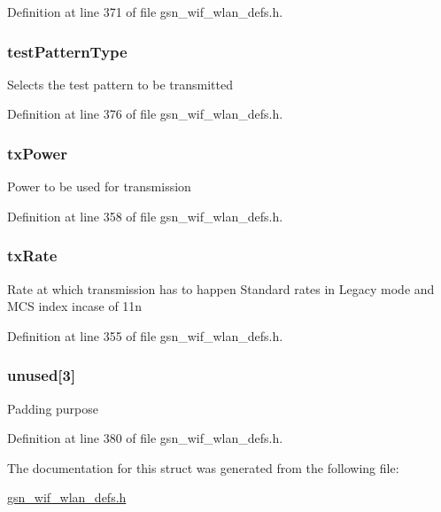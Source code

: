 Definition at line 371 of file gsn\_\-wif\_\-wlan\_\-defs.h.

\hypertarget{a00190_aed5aa730c4619f7bc2b04f439f4701a9}{
\subsubsection[{testPatternType}]{ {\bf testPatternType}}}
\label{a00190_aed5aa730c4619f7bc2b04f439f4701a9}
Selects the test pattern to be transmitted 

Definition at line 376 of file gsn\_\-wif\_\-wlan\_\-defs.h.

\hypertarget{a00190_a763a8a049f451428e05835d3c3b466cd}{
\subsubsection[{txPower}]{ {\bf txPower}}}
\label{a00190_a763a8a049f451428e05835d3c3b466cd}
Power to be used for transmission 

Definition at line 358 of file gsn\_\-wif\_\-wlan\_\-defs.h.

\hypertarget{a00190_ab1ab70812caf37881581c451398a6f9c}{
\subsubsection[{txRate}]{ {\bf txRate}}}
\label{a00190_ab1ab70812caf37881581c451398a6f9c}
Rate at which transmission has to happen Standard rates in Legacy mode and MCS index incase of 11n 

Definition at line 355 of file gsn\_\-wif\_\-wlan\_\-defs.h.

\hypertarget{a00190_ac4a97c2d503f89d8d7c4796e7e3e6c54}{
\subsubsection[{unused}]{ {\bf unused}\mbox{[}3\mbox{]}}}
\label{a00190_ac4a97c2d503f89d8d7c4796e7e3e6c54}
Padding purpose 

Definition at line 380 of file gsn\_\-wif\_\-wlan\_\-defs.h.



The documentation for this struct was generated from the following file:\begin{DoxyCompactItemize}
\item 
\hyperlink{a00613}{gsn\_\-wif\_\-wlan\_\-defs.h}\end{DoxyCompactItemize}
